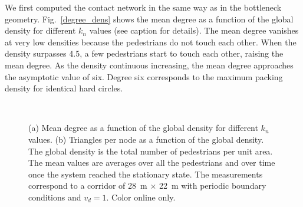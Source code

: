\documentclass[preprint,12pt]{elsarticle}
\begin{document}
We first computed the contact network in the same way 
as in the bottleneck geometry. Fig.~\ref{degree_dens} shows the 
mean degree as a function of the global density for different $k_n$ values (see 
caption for details). The mean degree vanishes at very low 
densities because the pedestrians do not touch each other. When the density 
surpasses 4.5, a few pedestrians start to touch each other, 
raising the mean degree. As the density continuous increasing, 
the mean degree approaches the asymptotic value 
of six. Degree six corresponds to the maximum packing density for identical 
hard circles.\\


\begin{figure}[!htbp]
\centering
    
\ 
\\
\caption[width=0.47\columnwidth]{(a) Mean degree as a function 
of the global density for different $k_n$ values. (b)  Triangles per node as a 
function of the global density. The global density is the total number of 
pedestrians per unit area. The mean values are averages over all the pedestrians 
and over time once the system reached the stationary state. The measurements 
correspond to a corridor of 28~m $\times$ 22~m with periodic boundary conditions 
and $v_d=1$. Color online only.}
\label{network_corridor}
\end{figure}
\end{document}
